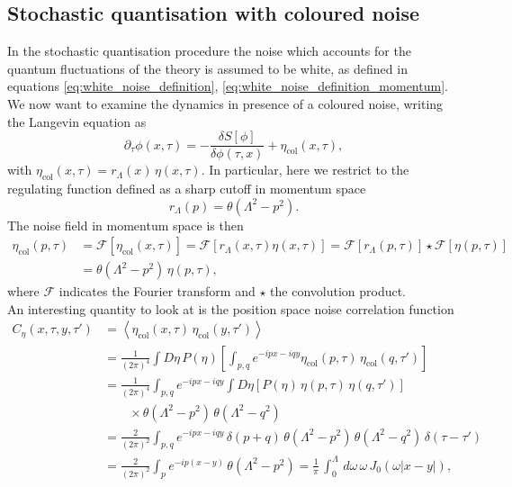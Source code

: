 \subsection{Stochastic quantisation with coloured noise}
\label{sec:coloured_noise}
In the stochastic quantisation procedure the noise which accounts for the quantum fluctuations of the theory is assumed to be white, as defined in equations \eqref{eq:white_noise_definition}, \eqref{eq:white_noise_definition_momentum}. 
We now want to examine the dynamics in presence of a coloured noise, writing the Langevin equation as
\begin{equation*}
    \partial_\tau \phi(x, \tau) = - \frac{\delta S[\phi]}{\delta \phi (\tau, x)} + \eta_\text{col}(x, \tau),
    \label{eq:Langevin_scalar_regularised}
\end{equation*}
with $\eta_\text{col}(x,\tau) = r_\Lambda(x) \, \eta(x,\tau)$. In particular, here we restrict to the regulating function defined as a sharp cutoff in momentum space
\begin{equation}
    r_\Lambda(p) = \theta(\Lambda^2 - p^2).
    \label{eq:regulator}
\end{equation}
The noise field in momentum space is then
\begin{equation*}
    \begin{aligned}
        \eta_\text{col}(p, \tau) &= \mathcal{F}[\eta_\text{col}(x,\tau)] = \mathcal{F}[r_\Lambda(x,\tau) \eta(x,\tau)] = \mathcal{F}[r_\Lambda(p,\tau)] \star \mathcal{F}[\eta(p,\tau)] \\
        &= \theta(\Lambda^2 - p^2)  \, \eta(p, \tau),
    \end{aligned}
\end{equation*}
where $\mathcal{F}$ indicates the Fourier transform and $\star$ the convolution product. \\
An interesting quantity to look at is the position space noise correlation function
\begin{equation}
    \begin{aligned}
        C_{\eta}(x,\tau,y,\tau') &= \left\langle\eta_\text{col}(x,\tau) \, \eta_\text{col}(y,\tau')\right\rangle \\
        &= \frac{1}{(2\pi)^{4}} \int D\eta \, P(\eta) \left[\int_{p,q} e^{-ipx-iqy }\eta_\text{col}(p,\tau) \, \eta_\text{col}(q,\tau')\right] \\
        &= \frac{1}{(2\pi)^{4}} \int_{p,q} e^{-ipx-iqy } \int D\eta \left[ P(\eta) \, \eta(p,\tau) \, \eta(q,\tau') \right] \\
        &\qquad\times \theta(\Lambda^2 - p^2) \, \theta(\Lambda^2 - q^2)  \\
        &= \frac{2}{(2\pi)^{2}} \int_{p,q} e^{-ipx-iqy} \, \delta(p+q) \, \theta(\Lambda^2 - p^2) \, \theta(\Lambda^2 - q^2) \, \delta(\tau - \tau') \\
        &= \frac{2}{(2\pi)^{2}} \int_{p} e^{-ip(x-y)} \, \theta(\Lambda^2 - p^2) = \frac{1}{\pi} \, \int_0^\Lambda \, d\omega \, \omega \, J_0(\omega |x-y|),
    \end{aligned}
    \label{eq:coloured_noise_correlation}
\end{equation}
